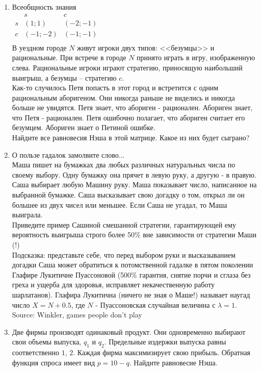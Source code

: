 \documentclass[pdftex,12pt,a4paper]{article}
\begin{document}
\begin{enumerate}
\item Всеобщность знания\\
$\begin{array}{c|cc}
    {} &  s & c   \\
\hline
    s &  {\left( {1;1} \right)} & {\left( { - 2; - 1} \right)}   \\
    c &  {\left( { - 1; - 2} \right)} & {\left( { - 1; - 1} \right)}   \\
\end{array}$\\
В уездном городе $N$ живут игроки двух типов: <<безумцы>> и рациональные. При встрече в городе $N$ принято играть в игру, изображенную слева. Рациональные игроки играют стратегию, приносящую наибольший выигрыш, а безумцы – стратегию $c$.\\
Как-то случилось Петя попасть в этот город и встретится с одним рациональным аборигеном. Они никогда раньше не виделись и никогда больше не увидятся. Петя знает, что абориген - рационален. Абориген знает, что Петя - рационален. Петя ошибочно полагает, что абориген считает его безумцем. Абориген знает о Петиной ошибке.\\
Найдите все равновесия Нэша в этой матрице. Какое из них будет сыграно?

\item О пользе гадалок замолвите слово... \\
Маша пишет на бумажках два любых различных натуральных числа по своему выбору. Одну бумажку она прячет в левую руку, а другую - в правую. Саша выбирает любую Машину руку. Маша показывает число, написанное на выбранной бумажке. Саша высказывает свою догадку о том, открыл ли он большее из двух чисел или меньшее. Если Саша не угадал, то Маша выиграла.\\
Приведите пример Сашиной смешанной стратегии, гарантирующей ему вероятность выигрыша строго более 50\% вне зависимости от стратегии Маши (!) \\
Подсказка: представьте себе, что перед выбором руки и высказыванием догадки Саша может обратиться к потомственной гадалке в пятом поколении Глафире Лукитичне Пуассоновой (500\% гарантия, снятие порчи и сглаза без греха и ущерба для здоровья, исправляет некачественную работу шарлатанов). Глафира Лукитична (ничего не зная о Маше!) называет наугад число $X=N+0.5$, где $N$ - Пуассоновская случайная величина с $\lambda=1$.  \\
Source: Winkler, games people don't play 

\item Две фирмы производят одинаковый продукт. Они одновременно выбирают свои объемы выпуска, $q_1$ и $q_2$. Предельные издержки выпуска равны соответственно $1$, $2$. Каждая фирма максимизирует свою прибыль. Обратная функция спроса имеет вид $p=10-q$. Найдите равновесие Нэша.

\end{enumerate}
\end{document}
